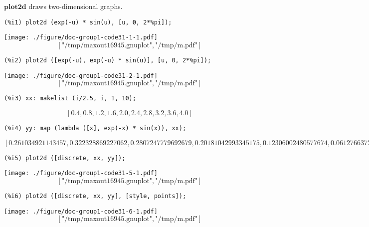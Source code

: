 \documentclass[12pt,leqno]{article}
\begin{document}
$\mathbf{plot2d}$ draws two-dimensional graphs.
\begin{verbatim}
(%i1) plot2d (exp(-u) * sin(u), [u, 0, 2*%pi]);
\end{verbatim}
\texttt{[image: ./figure/doc-group1-code31-1-1.pdf]}
\begin{dmath}[number={\(\mathop{\mathrm{\%o}_{1}}\)}]
\left[\text{"/tmp/maxout16945.gnuplot"}, \text{"/tmp/m.pdf"}\right]
\end{dmath}
\begin{verbatim}
(%i2) plot2d ([exp(-u), exp(-u) * sin(u)], [u, 0, 2*%pi]);
\end{verbatim}
\texttt{[image: ./figure/doc-group1-code31-2-1.pdf]}
\begin{dmath}[number={\(\mathop{\mathrm{\%o}_{2}}\)}]
\left[\text{"/tmp/maxout16945.gnuplot"}, \text{"/tmp/m.pdf"}\right]
\end{dmath}
\begin{verbatim}
(%i3) xx: makelist (i/2.5, i, 1, 10);
\end{verbatim}
\begin{dmath}[number={\(\mathop{\mathrm{\%o}_{3}}\)}]
\left[0.4, 0.8, 1.2, 1.6, 2.0, 2.4, 2.8, 3.2, 3.6, 4.0\right]
\end{dmath}
\begin{verbatim}
(%i4) yy: map (lambda ([x], exp(-x) * sin(x)), xx);
\end{verbatim}
\begin{dmath}[number={\(\mathop{\mathrm{\%o}_{4}}\)}]
\left[0.261034921143457, 0.322328869227062, 0.2807247779692679, 0.20181042993345175, 0.12306002480577674, 0.06127663726195732, 0.020370650389686513, -0.0023794587414574246, -0.012091305769841415, -0.013861321214152955\right]
\end{dmath}
\begin{verbatim}
(%i5) plot2d ([discrete, xx, yy]);
\end{verbatim}
\texttt{[image: ./figure/doc-group1-code31-5-1.pdf]}
\begin{dmath}[number={\(\mathop{\mathrm{\%o}_{5}}\)}]
\left[\text{"/tmp/maxout16945.gnuplot"}, \text{"/tmp/m.pdf"}\right]
\end{dmath}
\begin{verbatim}
(%i6) plot2d ([discrete, xx, yy], [style, points]);
\end{verbatim}
\texttt{[image: ./figure/doc-group1-code31-6-1.pdf]}
\begin{dmath}[number={\(\mathop{\mathrm{\%o}_{6}}\)}]
\left[\text{"/tmp/maxout16945.gnuplot"}, \text{"/tmp/m.pdf"}\right]
\end{dmath}
\end{document}
